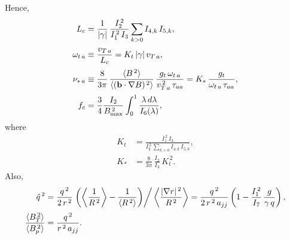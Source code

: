 \documentclass[12pt]{article}
\begin{document}
Hence,
\begin{align}
L_c &= \frac{1}{|\gamma|}\,\frac{I_2^{\,2}}{I_1^{\,2}\,I_3}\sum_{k>0}
I_{4,k}\,I_{5,k},\\[0.5ex]
\omega_{t\,a}&\equiv \frac{v_{T\,a}}{L_c} = K_{t}\,|\gamma|\,v_{T\,a},\\[0.5ex]
\nu_{\ast\,a} &\equiv \frac{8}{3\pi}\,\frac{\langle B^{\,2}\rangle}{\langle
({\bf b}\cdot\nabla B)^{\,2}\rangle}\,\frac{g_t\,\omega_{t\,a}}{v_{T\,a}^{\,2}\,\tau_{aa}}= K_{\ast}\,\frac{g_t}{\omega_{t\,a}\,\tau_{aa}},\\[0.5ex]
f_c &=\frac{3}{4} \frac{I_2}{B_{\rm max}^{\,2}}\int_0^{1}\frac{\lambda\,d\lambda}{I_6(\lambda)},
\end{align}
where 
\begin{align}
K_{t} &= \frac{I_1^{\,2}\,I_3}{I_2^{\,2}\,\sum_{k>0}I_{4,k}\,I_{5,k}},\\[0.5ex]
K_{\ast}&= \frac{8}{3\pi}\,\frac{I_2}{I_3}\,K_{t}^{\,2}.
\end{align}
Also,
\begin{align}
\hat{q}^{\,2} &= \frac{q^{\,2}}{2\,r^{\,2}}\left.\left(\left\langle \frac{1}{R^{\,2}}\right\rangle - \frac{1}{\langle R^{\,2}\rangle}\right)\right/\left\langle\frac{|\nabla r|^{\,2}}{R^{\,2}}\right\rangle = \frac{q^{\,2}}{2\,r^{\,2}\,a_{jj}}\left(
1-\frac{I_1^{\,2}}{I_7}\,\frac{g}{\gamma\,q}\right),\\[0.5ex]
\frac{\langle B_T^{\,2}\rangle}{\langle B_p^{\,2}\rangle}&= \frac{q^{\,2}}{r^{\,2}\,a_{jj}}.
\end{align}
\end{document}
